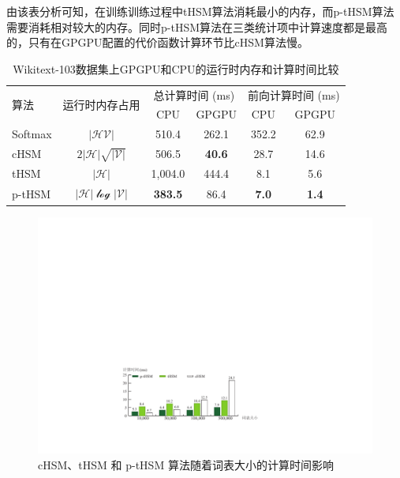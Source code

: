 由该表分析可知，在训练训练过程中tHSM算法消耗最小的内存，而p-tHSM算法需要消耗相对较大的内存。同时p-tHSM算法在三类统计项中计算速度都是最高的，只有在GPGPU配置的代价函数计算环节比cHSM算法慢。

\begin{table}[!ht]
  \centering
  \caption{Wikitext-103数据集上GPGPU和CPU的运行时内存和计算时间比较\label{tab:time}}
\begin{tabular}{lccccc}
  \toprule
 \multirow{2}{*}{算法}  &\multirow{2}{*}{运行时内存占用} &\multicolumn{2}{c}{总计算时间 (ms)} & \multicolumn{2}{c}{前向计算时间 (ms)}   \\
   \cmidrule(lr){3-4}  \cmidrule(lr){5-6}
	& & CPU&GPGPU & CPU& GPGPU \\ \midrule
Softmax & $\mathcal{|HV|}$ &510.4  &262.1&352.2& 62.9 \\
cHSM    & $2\mathcal{|H|\sqrt{|V|}}$&506.5  &\textbf{40.6}&28.7&14.6 \\
tHSM    &$\mathcal{|H|}$&1,004.0 &444.4 & 8.1&  5.6   \\
p-tHSM  &$\mathcal{|H|\log{|V|}}$ &\textbf{383.5}&	86.4 &\textbf{7.0}&	\textbf{1.4} \\
  \bottomrule
\end{tabular}
\end{table}

\begin{figure}[!t]
  \centering
  \includegraphics[width=.87\columnwidth]{./figures/all_time.pdf}
  \caption{cHSM、tHSM 和 p-tHSM 算法随着词表大小的计算时间影响}\label{fig:hsm_benchmark}
\end{figure}

